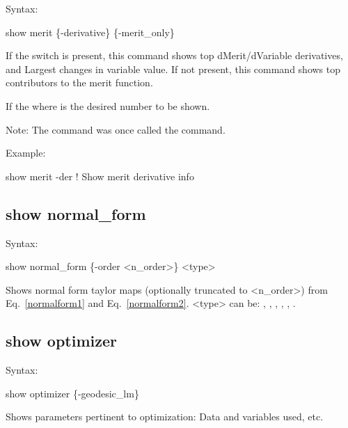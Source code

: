 {{{{{Syntax:
\begin{example}
  show merit \{-derivative\} \{-merit_only\}
\end{example}

If the  switch is present, this command shows top dMerit/dVariable
derivatives, and Largest changes in variable value.  If not present, this command shows
top contributors to the merit function.

If the  where  is the desired number to be shown.

Note: The  command was once called the  command.


Example:
\begin{example}
  show merit -der     ! Show merit derivative info
\end{example}


\subsection{show normal_form}
\label{s:show.normal}

Syntax:
\begin{example}
  show normal_form \{-order <n_order>\} <type>
\end{example}


Shows normal form taylor maps (optionally truncated to <n\_order>) from Eq.~\ref{normalform1}
 and Eq.~\ref{normalform2}. <type> can be: , , , , , . 




\subsection{show optimizer}
\label{s:show.optimizer}

Syntax:
\begin{example}
  show optimizer \{-geodesic_lm\}
\end{example}


Shows parameters pertinent to optimization: Data and variables used,
etc. 

}}}}}
